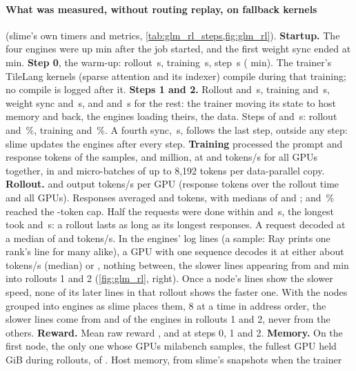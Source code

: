 \paragraph{What was measured, without routing replay, on fallback kernels} (slime's own timers and metrics, \cref{tab:glm_rl_steps,fig:glm_rl}). \textbf{Startup.} The four engines were up \TriGrEnginesUp{} min after the job started, and the first weight sync ended at \TriGrStartup{} min. \textbf{Step 0}, the warm-up: rollout \TriGrWarmRollout\,s, training \TriGrWarmTrain\,s, step \TriGrWarmStep\,s (\TriGrWarmStepMin{} min). The trainer's TileLang kernels (sparse attention and its indexer) compile during that training; no compile is logged after it. \textbf{Steps 1 and 2.} Rollout \TriGrRolloutOne{} and \TriGrRolloutTwo\,s, training \TriGrTrainOne{} and \TriGrTrainTwo\,s, weight sync \TriGrSyncOne{} and \TriGrSyncTwo\,s, and \TriGrRestOne{} and \TriGrRestTwo\,s for the rest: the trainer moving its state to host memory and back, the engines loading theirs, the data. Steps of \TriGrStepOne{} and \TriGrStepTwo\,s: rollout \TriGrRolloutPctOne{} and \TriGrRolloutPctTwo\,\%, training \TriGrTrainPctOne{} and \TriGrTrainPctTwo\,\%. A fourth sync, \TriGrSyncFinal\,s, follows the last step, outside any step: slime updates the engines after every step. \textbf{Training} processed the prompt and response tokens of the \TriGrSamples{} samples, \TriGrTrainTokensOne{} and \TriGrTrainTokensTwo{} million, at \TriGrTrainTokOne{} and \TriGrTrainTokTwo{} tokens/s for all GPUs together, in \TriGrMicroOne{} and \TriGrMicroTwo{} micro-batches of up to 8,192 tokens per data-parallel copy. \textbf{Rollout.} \TriGrRollTokOne{} and \TriGrRollTokTwo{} output tokens/s per GPU (response tokens over the rollout time and all \TriGrGpus{} GPUs). Responses averaged \TriGrRespMeanOne{} and \TriGrRespMeanTwo{} tokens, with medians of \TriGrRespMedOne{} and \TriGrRespMedTwo; \TriGrTruncOne{} and \TriGrTruncTwo\,\% reached the \TriGrMaxResp-token cap. Half the requests were done within \TriGrLatMedOne{} and \TriGrLatMedTwo\,s, the longest took \TriGrLatMaxOne{} and \TriGrLatMaxTwo\,s: a rollout lasts as long as its longest responses. A request decoded at a median of \TriGrDecodeReqOne{} and \TriGrDecodeReqTwo{} tokens/s. In the engines' log lines (a sample: Ray prints one rank's line for many alike), a GPU with one sequence decodes it at either about \TriGrDecodeFast{} tokens/s (median) or \TriGrDecodeSlow, nothing between, the slower lines appearing from \TriGrSlowFirstOne{} and \TriGrSlowFirstTwo{} min into rollouts 1 and 2 (\cref{fig:glm_rl}, right). Once a node's lines show the slower speed, none of its later lines in that rollout shows the faster one. With the nodes grouped into engines as slime places them, 8 at a time in address order, the slower lines come from \TriGrSlowEnginesOne{} and \TriGrSlowEnginesTwo{} of the \TriGrEngines{} engines in rollouts 1 and 2, never from the others. \textbf{Reward.} Mean raw reward \TriGrRewardWarm, \TriGrRewardOne{} and \TriGrRewardTwo{} at steps 0, 1 and 2. \textbf{Memory.} On the first node, the only one whose GPUs milabench samples, the fullest GPU held \TriGrGpuRollout{} GiB during rollouts, of \TriGrGpuCap. Host memory, from slime's snapshots when the trainer 